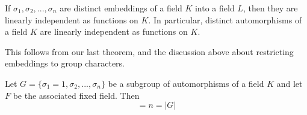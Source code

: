 \documentclass[12pt, a4paper, oneside, openright, titlepage]{book}
\begin{document}
\begin{cor}
    If $\sigma_1,\sigma_2,...,\sigma_n$ are distinct embeddings of a field $K$ into a field $L$, then they are linearly independent as functions on $K$. In particular, distinct automorphisms of a field $K$ are linearly independent as functions on $K$.
\end{cor}
This follows from our last theorem, and the discussion above about restricting embeddings to group characters.

\begin{thm}\label{thm:subfixed}
    Let $G=\{\sigma_1 = 1,\sigma_2,...,\sigma_n\}$ be a subgroup of automorphisms of a field $K$ and let $F$ be the associated fixed field. Then \begin{equation*}
        [K:F] = n = |G|
    \end{equation*}
\end{thm}
\end{document}
